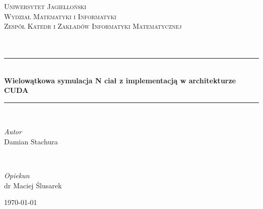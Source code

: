\documentclass[14pt,twoside,a4paper]{article}
\theoremstyle{definition}
\begin{document}
\begin{titlepage}
	\newcommand{\HRule}{\rule{\linewidth}{0.5mm}}
	
	\center
	
	\textsc{\Large Uniwersytet  Jagielloński\\
			 Wydział Matematyki i Informatyki\\
    		 Zespół Katedr i Zakładów Informatyki Matematycznej}\\[1.5cm]
	
	\textsc{\Large}\\[0.5cm]
	
	\textsc{\Large}\\[0.5cm]
	
	\HRule\\[0.4cm]
		
	{\huge\bfseries Wielowątkowa symulacja N ciał z implementacją w architekturze CUDA}\\[0.4cm] %
	
	\HRule\\[1.5cm]
	
	\begin{minipage}{0.4\textwidth}
		\begin{flushleft}
			\large
			\textit{Autor}\\
			Damian Stachura%
		\end{flushleft}
	\end{minipage}
	~
	\begin{minipage}{0.4\textwidth}
		\begin{flushright}
			\large
			\textit{Opiekun}\\
			dr Maciej Ślusarek %
		\end{flushright}
	\end{minipage}
	
	\vfill\vfill %
	
	{\large\today} %
	
\end{titlepage}

\newpage
\tableofcontents

\newpage
\end{document}
